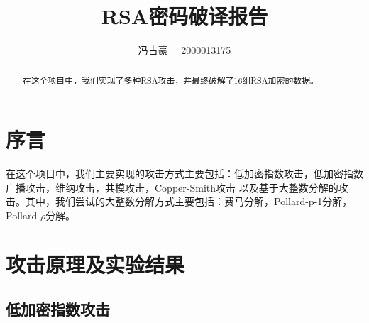 \documentclass[11pt]{article}
\title{RSA密码破译报告}
\author{冯古豪 \ \ 2000013175}
\date{}
\begin{document}
\maketitle

\begin{abstract}
    在这个项目中，我们实现了多种RSA攻击，并最终破解了16组RSA加密的数据。
\end{abstract}

\section{序言}\label{section-introduction}
在这个项目中，我们主要实现的攻击方式主要包括：低加密指数攻击，低加密指数广播攻击，维纳攻击，共模攻击，Copper-Smith攻击
以及基于大整数分解的攻击。其中，我们尝试的大整数分解方式主要包括：费马分解，Pollard-p-1分解，Pollard-$\rho$分解。

\section{攻击原理及实验结果}
\subsection{低加密指数攻击}
\end{document}
